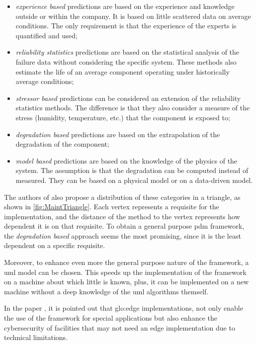 \begin{itemize}
    \item \emph{experience based} predictions are based on the experience and knowledge outside or within the company. It is based on little scattered data on average conditions. The only  requirement is that the experience of the experts is quantified and used;
    \item \emph{reliability statistics} predictions are based on the statistical analysis of the failure data without considering the specific system. These methods also estimate the life
    of an average component operating under historically average conditions;
    \item \emph{stressor based} predictions can be considered an extension of the reliability statistics methods. The difference is that they also consider a measure of the stress (humidity, temperature, etc.) that the component is exposed to;
    \item \emph{degradation based} predictions are based on the extrapolation of the degradation of the component;
    \item \emph{model based} predictions are based on the knowledge of the physics of the system. The assumption is that the degradation can be computed instead of measured. They can be based on a physical model or on a data-driven model.
\end{itemize}


The authors of \cite{Maintenance_cat} also propose a distribution of these categories in a triangle, as shown in \autoref{fig:MaintTriangle}. Each vertex represents a requisite for the implementation, and the distance of the method to the vertex represents how dependent it is on that requisite. To obtain a general purpose \gls{pdm} framework, the \emph{degradation based} approach seems the most promising, since it is the least dependent on a specific requisite.

Moreover, to enhance even more the general purpose nature of the framework, a \gls{uml} model can be chosen. This speeds up the implementation of the framework on a machine about which little is known, plus, it can be implemented on a new machine without a deep knowledge of the \gls{uml} algorithms themself.

In the paper \cite{GridPredictMaintenance}, it is pointed out that \gls{glo:edge} implementations, not only enable the use of the framework for special applications but also enhance the cybersecurity of facilities that may not need an edge implementation due to technical limitations.